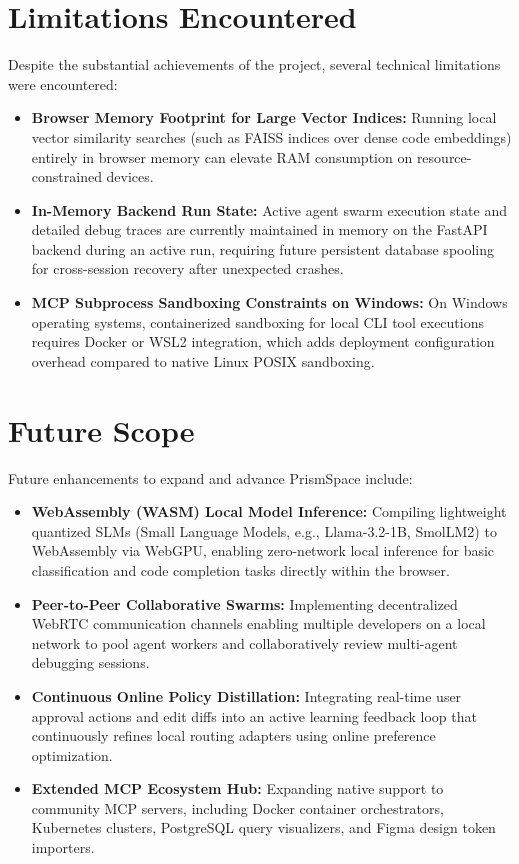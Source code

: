 \documentclass[12pt,a4paper]{report}
\begin{document}
\section{Limitations Encountered}
Despite the substantial achievements of the project, several technical limitations were encountered:
\begin{itemize}\setlength{\itemsep}{2pt}\setlength{\parskip}{0pt}\setlength{\parsep}{0pt}
    \item \textbf{Browser Memory Footprint for Large Vector Indices:} Running local vector similarity searches (such as FAISS indices over dense code embeddings) entirely in browser memory can elevate RAM consumption on resource-constrained devices.
    \item \textbf{In-Memory Backend Run State:} Active agent swarm execution state and detailed debug traces are currently maintained in memory on the FastAPI backend during an active run, requiring future persistent database spooling for cross-session recovery after unexpected crashes.
    \item \textbf{MCP Subprocess Sandboxing Constraints on Windows:} On Windows operating systems, containerized sandboxing for local CLI tool executions requires Docker or WSL2 integration, which adds deployment configuration overhead compared to native Linux POSIX sandboxing.
\end{itemize}

\section{Future Scope}
Future enhancements to expand and advance PrismSpace include:
\begin{itemize}\setlength{\itemsep}{2pt}\setlength{\parskip}{0pt}\setlength{\parsep}{0pt}
    \item \textbf{WebAssembly (WASM) Local Model Inference:} Compiling lightweight quantized SLMs (Small Language Models, e.g., Llama-3.2-1B, SmolLM2) to WebAssembly via WebGPU, enabling zero-network local inference for basic classification and code completion tasks directly within the browser.
    \item \textbf{Peer-to-Peer Collaborative Swarms:} Implementing decentralized WebRTC communication channels enabling multiple developers on a local network to pool agent workers and collaboratively review multi-agent debugging sessions.
    \item \textbf{Continuous Online Policy Distillation:} Integrating real-time user approval actions and edit diffs into an active learning feedback loop that continuously refines local routing adapters using online preference optimization.
    \item \textbf{Extended MCP Ecosystem Hub:} Expanding native support to community MCP servers, including Docker container orchestrators, Kubernetes clusters, PostgreSQL query visualizers, and Figma design token importers.
\end{itemize}
\end{document}
